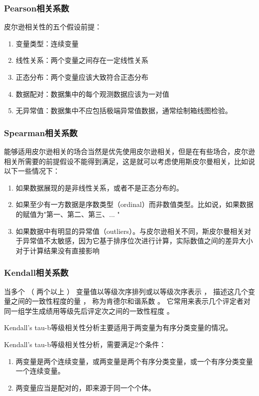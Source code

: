 \documentclass[dvipsnames, svgnames, x11names]{beamer}
\begin{document}
\begin{frame}
    \frametitle{Pearson相关系数}
    皮尔逊相关性的五个假设前提：
    \begin{enumerate}
      \item 变量类型：连续变量
      \item 线性关系：两个变量之间存在一定线性关系
      \item 正态分布：两个变量应该大致符合正态分布
      \item 数据配对：数据集中的每个观测数据应该为一对值
      \item 无异常值：数据集中不应包括极端异常值数据，通常绘制箱线图检验。
    \end{enumerate}
\end{frame}


\begin{frame}
    \frametitle{Spearman相关系数}
    能够适用皮尔逊相关的场合当然是优先使用皮尔逊相关，但是在有些场合，皮尔逊相关所需要的前提假设不能得到满足，这是就可以考虑使用斯皮尔曼相关，比如说以下一些情况下：
    \begin{enumerate}
      \item 如果数据展现的是非线性关系，或者不是正态分布的。
      \item 如果至少有一方数据是序数类型（ordinal）而非数值类型。比如说，如果数据的赋值为"第一、第二、第三、... "
      \item 如果数据中有明显的异常值（outliers）。与皮尔逊相关不同，斯皮尔曼相关对于异常值不太敏感，因为它基于排序位次进行计算，实际数值之间的差异大小对于计算结果没有直接影响
    \end{enumerate}
\end{frame}


\begin{frame}
    \frametitle{Kendall相关系数}
    当多个 （ 两个以上 ） 变量值以等级次序排列或以等级次序表示 ， 描述这几个变量之间的一致性程度的量 ， 称为肯德尔和谐系数 。 它常用来表示几个评定者对同一组学生成绩用等级先后评定次之间的一致性程度 。

    Kendall's tau-b等级相关性分析主要适用于两变量为有序分类变量的情况。

    Kendall's tau-b等级相关性分析，需要满足2个条件：

    \begin{enumerate}
      \item 两变量是两个连续变量，或两变量是两个有序分类变量，或一个有序分类变量一个连续变量。
      \item 两变量应当是配对的，即来源于同一个个体。
    \end{enumerate}
\end{frame}
\end{document}

